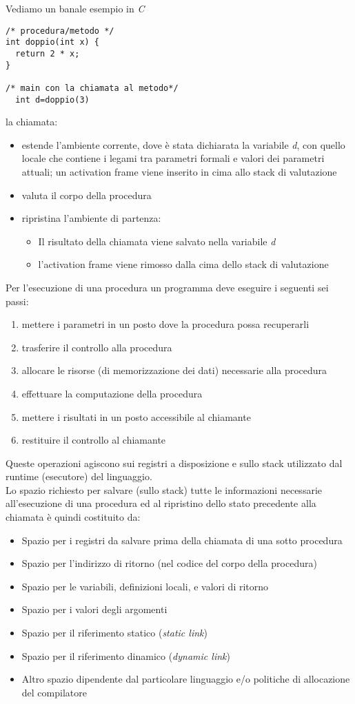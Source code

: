 \documentclass[a4paper,12pt, oneside]{book}
\begin{document}
\begin{esempio}
Vediamo un banale esempio in \textit{C}
\begin{verbatim}
/* procedura/metodo */
int doppio(int x) { 
  return 2 * x; 
}

/* main con la chiamata al metodo*/
  int d=doppio(3)
\end{verbatim}
la chiamata:
\begin{itemize}
\item estende l'ambiente corrente, dove è stata dichiarata la variabile \textit{d}, con quello locale che contiene i legami tra parametri formali e valori dei parametri attuali; un activation frame viene inserito in cima allo stack di valutazione
\item valuta il corpo della procedura
\item ripristina l'ambiente di partenza:
\begin{itemize}
\item Il risultato della chiamata viene salvato nella variabile \textit{d}
\item l'activation frame viene rimosso dalla cima dello stack di valutazione
\end{itemize}
\end{itemize}
\end{esempio}
Per l'esecuzione di una procedura un programma deve eseguire i seguenti sei passi:
\begin{enumerate}
\item mettere i parametri in un posto dove la procedura possa recuperarli
\item trasferire il controllo alla procedura
\item allocare le risorse (di memorizzazione dei dati) necessarie alla procedura
\item effettuare la computazione della procedura
\item mettere i risultati in un posto accessibile al chiamante
\item restituire il controllo al chiamante
\end{enumerate}
Queste operazioni agiscono sui registri a disposizione e sullo stack utilizzato dal runtime (esecutore) del linguaggio.\\
Lo spazio richiesto per salvare (sullo stack) tutte le informazioni necessarie all'esecuzione di una procedura ed al ripristino dello stato precedente alla chiamata è quindi costituito da:
\begin{itemize}
\item Spazio per i registri da salvare prima della chiamata di una sotto procedura
\item Spazio per l'indirizzo di ritorno (nel codice del corpo della procedura)
\item Spazio per le variabili, definizioni locali, e valori di ritorno
\item Spazio per i valori degli argomenti
\item Spazio per il riferimento statico (\textit{static link})
\item Spazio per il riferimento dinamico (\textit{dynamic link})
\item Altro spazio dipendente dal particolare linguaggio e/o politiche di allocazione del compilatore
\end{itemize}
\end{document}
